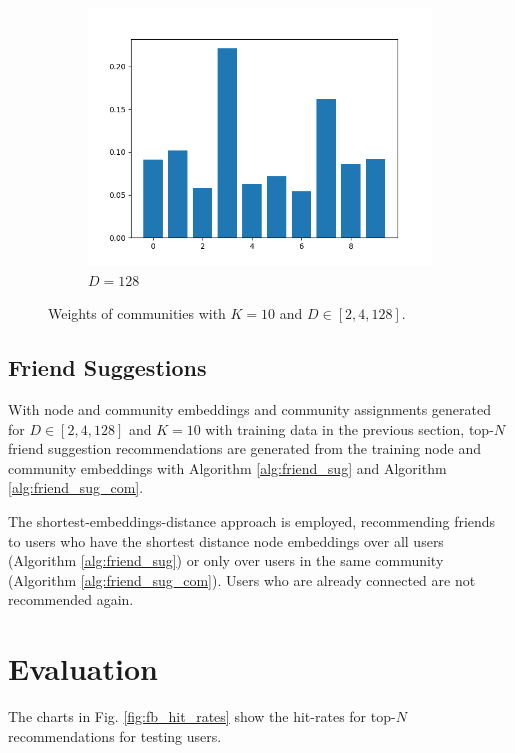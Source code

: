 \documentclass[conference]{IEEEtran}
\begin{document}
\begin{figure}[htbp]
\begin{subfigure}{.33\textwidth}
        \centering
        \includegraphics[width=1\linewidth]{images/fb/weights_d128.png}
        \caption{$D=128$}
        \label{fig:fb_emb_weights_d128}
    \end{subfigure}%
    \caption{Weights of communities with $K=10$ and $D \in [2,4,128]$.}
    \label{fig:fb_emb_weights}
\end{figure}

\subsection{Friend Suggestions}

With node and community embeddings and community assignments generated for $D \in [2,4,128]$ and $K=10$ with training data in the previous section, top-$N$ friend suggestion recommendations are generated from the training node and community embeddings with Algorithm \ref{alg:friend_sug} and Algorithm \ref{alg:friend_sug_com}.

The shortest-embeddings-distance approach is employed, recommending friends to users who have the shortest distance node embeddings over all users (Algorithm \ref{alg:friend_sug}) or only over users in the same community (Algorithm \ref{alg:friend_sug_com}). Users who are already connected are not recommended again.

\section{Evaluation}

The charts in Fig. \ref{fig:fb_hit_rates} show the hit-rates for top-$N$ recommendations for testing users.
\end{document}
